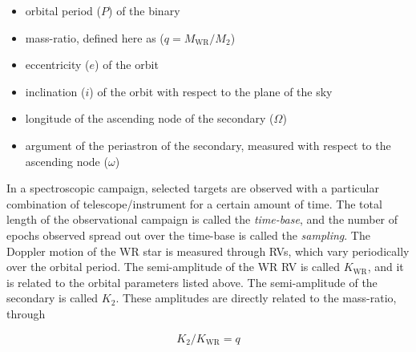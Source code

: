 \begin{itemize}
    \item orbital period ($P$) of the binary
    \item mass-ratio, defined here as ($q = M_{\textrm{WR}}/M_2$)
    \item eccentricity ($e$) of the orbit
    \item inclination ($i$) of the orbit with respect to the plane of the sky
    \item longitude of the ascending node of the secondary ($\Omega$)
    \item argument of the periastron of the secondary, measured with respect to the ascending node ($\omega$)
\end{itemize}

In a spectroscopic campaign, selected targets are observed with a particular combination of telescope/instrument for a certain amount of time. The total length of the observational campaign is called the \textit{time-base}, and the number of epochs observed spread out over the time-base is called the \textit{sampling}. The Doppler motion of the WR star is measured through RVs, which vary periodically over the orbital period. The semi-amplitude of the WR RV is called $K_{\textrm{WR}}$, and it is related to the orbital parameters listed above. The semi-amplitude of the secondary is called $K_2$. These amplitudes are directly related to the mass-ratio, through

\begin{equation}
    K_2/K_{\textrm{WR}} = q
\end{equation}

